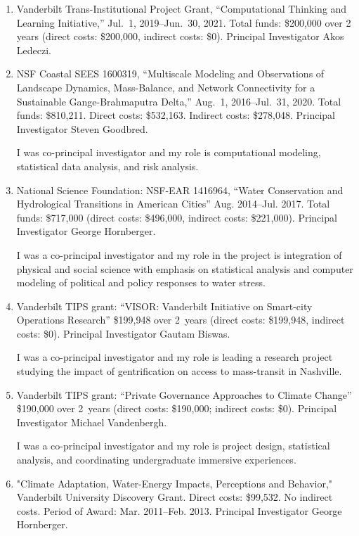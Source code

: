 \begin{enumerate}
\item Vanderbilt Trans-Institutional Project Grant,
``Computational Thinking and Learning Initiative,''
Jul.~1, 2019--Jun.~30, 2021.
Total funds: \$200,000 over 2 years (direct costs: \$200,000, indirect costs: \$0).
Principal Investigator Akos Ledeczi.
%
\item NSF Coastal SEES 1600319,
``Multiscale Modeling and Observations of Landscape Dynamics, Mass-Balance, and Network Connectivity for a Sustainable Gange-Brahmaputra Delta,''
Aug.~1, 2016--Jul.~31, 2020.
Total funds: \$810,211. Direct costs: \$532,163. Indirect costs: \$278,048.
Principal Investigator Steven Goodbred.
\begin{credit}
I was co-principal investigator and my role is computational modeling, statistical data analysis, and risk analysis.
\end{credit}
%
%
\item National Science Foundation: NSF-EAR 1416964,
``Water Conservation and Hydrological Transitions in American Cities''
Aug. 2014--Jul. 2017.
Total funds: \$717,000 (direct costs: \$496,000, indirect costs: \$221,000).
Principal Investigator George Hornberger.
\begin{credit}
I was a co-principal investigator and my role in the project is integration of physical and social science with emphasis on statistical analysis and
computer modeling of political and policy responses to water stress.
\end{credit}
%
%
\item Vanderbilt TIPS grant: ``VISOR: Vanderbilt Initiative on Smart-city Operations Research'' \$199,948 over 2~years (direct costs: \$199,948, indirect costs: \$0). Principal Investigator Gautam Biswas.
\begin{credit}
I was a co-principal investigator and my role is leading a research project studying the impact of gentrification on access to mass-transit in Nashville.
\end{credit}
%
%
\item Vanderbilt TIPS grant: ``Private Governance Approaches to Climate Change'' \$190,000 over 2~years (direct costs: \$190,000; indirect costs: \$0). Principal Investigator Michael Vandenbergh.
\begin{credit}
I was a co-principal investigator and my role is project design, statistical analysis, and coordinating undergraduate immersive experiences.
\end{credit}
%
%
\item "Climate Adaptation, Water-Energy Impacts, Perceptions and Behavior," Vanderbilt University Discovery Grant. Direct costs: \$99,532. No indirect costs. Period of Award: Mar. 2011--Feb. 2013. Principal Investigator George Hornberger.

\end{enumerate}
